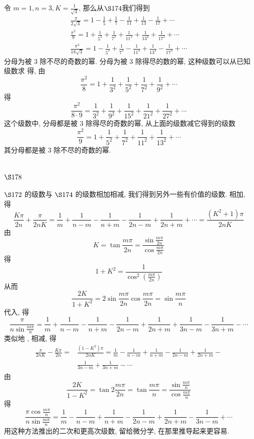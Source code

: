 令 $m=1, n=3, K=\frac{1}{\sqrt{3}}$, 那么从$\S 174$我们得到 
\[
\begin{gathered}
\frac{\pi}{2 \sqrt{3}}=1-\frac{1}{5}+\frac{1}{7}-\frac{1}{11}+\frac{1}{13}-\frac{1}{17}+\cdots \\
\frac{\pi^{2}}{9}=1+\frac{1}{5^{2}}+\frac{1}{7^{2}}+\frac{1}{11^{2}}+\frac{1}{13^{2}}+\frac{1}{17^{2}}+\cdots \\
\frac{\pi^{3}}{18 \sqrt{3}}=1-\frac{1}{5^{3}}+\frac{1}{7^{3}}-\frac{1}{11^{3}}+\frac{1}{13^{3}}-\frac{1}{17^{3}}+\cdots
\end{gathered}
\]
分母为被 3 除不尽的奇数的幂. 分母为被 3 除得尽的数的幂, 这种级数可以从已知级数求 得, 由
\[
\frac{\pi^{2}}{8}=1+\frac{1}{3^{2}}+\frac{1}{5^{2}}+\frac{1}{7^{2}}+\frac{1}{9^{2}}+\cdots
\]
得
\[
\frac{\pi^{2}}{8 \cdot 9}=\frac{1}{3^{2}}+\frac{1}{9^{2}}+\frac{1}{15^{2}}+\frac{1}{21^{2}}+\frac{1}{27^{2}}+\cdots
\]
这个级数中, 分母都是被 3 除得尽的奇数的幂, 从上面的级数减它得到的级数
\[
\frac{\pi^{2}}{9}=1+\frac{1}{5^{2}}+\frac{1}{7^{2}}+\frac{1}{11^{2}}+\frac{1}{13^{2}}+\cdots
\]
其分母都是被 3 除不尽的奇数的幂.

\section{$\S 178$}

$\S 172$ 的级数与 $\S 174$ 的级数相加相减, 我们得到另外一些有价值的级数. 相加, 得
\[
\frac{K \pi}{2 n}+\frac{\pi}{2 n K}=\frac{1}{m}+\frac{1}{n-m}-\frac{1}{n+m}-\frac{1}{2 n-m}+\frac{1}{2 n+m}+\cdots=\frac{\left(K^{2}+1\right) \pi}{2 n K}
\]
由 
\[
K=\tan \frac{m \pi}{2 n}=\frac{\sin \frac{m \pi}{2 n}}{\cos \frac{m \pi}{2 n}}
\]
得
\[
1+K^{2}=\frac{1}{\cos ^{2}\left(\frac{m \pi}{2 n}\right)}
\]
从而
\[
\frac{2 K}{1+K^{2}}=2 \sin \frac{m \pi}{2 n} \cos \frac{m \pi}{2 n}=\sin \frac{m \pi}{n}
\]
代入, 得
\[
\frac{\pi}{n \sin \frac{m \pi}{n}}=\frac{1}{m}+\frac{1}{n-m}-\frac{1}{n+m}-\frac{1}{2 n-m}+\frac{1}{2 n+m}+\frac{1}{3 n-m}-\frac{1}{3 n+m}-\cdots
\]
类似地 , 相减, 得
\[
\begin{aligned}
\frac{\pi}{2 n K}-\frac{K \pi}{2 n}= & \frac{\left(1-K^{2}\right) \pi}{2 n K}=\frac{1}{m}-\frac{1}{n-m}+\frac{1}{n+m}-\frac{1}{2 n-m}+\frac{1}{2 n+m}- \\
& \frac{1}{3 n-m}+\frac{1}{3 n+m}-\cdots
\end{aligned}
\]
由
\[
\frac{2 K}{1-K^{2}}=\tan 2 \frac{m \pi}{2 n}=\tan \frac{m \pi}{n}=\frac{\sin \frac{m \pi}{n}}{\cos \frac{m \pi}{n}}
\]
得
\[
\frac{\pi \cos \frac{m \pi}{n}}{n \sin \frac{m \pi}{n}}=\frac{1}{m}-\frac{1}{n-m}+\frac{1}{n+m}-\frac{1}{2 n-m}+\frac{1}{2 n+m}-\frac{1}{3 n-m}+\cdots
\]
用这种方法推出的二次和更高次级数, 留给微分学, 在那里推导起来更容易.


